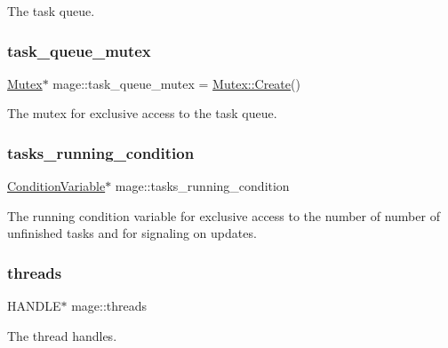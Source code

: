 The task queue. \hypertarget{namespacemage_a7de4544ddddcf8e0d54dbfdc0778f13f}{}\label{namespacemage_a7de4544ddddcf8e0d54dbfdc0778f13f} 
\subsubsection{\texorpdfstring{task\+\_\+queue\+\_\+mutex}{task\_queue\_mutex}}
{\footnotesize\ttfamily \hyperlink{classmage_1_1_mutex}{Mutex}$\ast$ mage\+::task\+\_\+queue\+\_\+mutex = \hyperlink{classmage_1_1_mutex_a48d784fa6bffd4088d9f89a2a9cca84e}{Mutex\+::\+Create}()\hspace{0.3cm}{\ttfamily [static]}}

The mutex for exclusive access to the task queue. \hypertarget{namespacemage_a8c04b4285ebbc0fb416b1905c01cf149}{}\label{namespacemage_a8c04b4285ebbc0fb416b1905c01cf149} 
\subsubsection{\texorpdfstring{tasks\+\_\+running\+\_\+condition}{tasks\_running\_condition}}
{\footnotesize\ttfamily \hyperlink{classmage_1_1_condition_variable}{Condition\+Variable}$\ast$ mage\+::tasks\+\_\+running\+\_\+condition\hspace{0.3cm}{\ttfamily [static]}}

The running condition variable for exclusive access to the number of number of unfinished tasks and for signaling on updates. \hypertarget{namespacemage_a15e9f7d36194ec1b768a82a2294cce6c}{}\label{namespacemage_a15e9f7d36194ec1b768a82a2294cce6c} 
\subsubsection{\texorpdfstring{threads}{threads}}
{\footnotesize\ttfamily H\+A\+N\+D\+LE$\ast$ mage\+::threads\hspace{0.3cm}{\ttfamily [static]}}

The thread handles. \hypertarget{namespacemage_a0f27594da3814c163fe995326acf6c5e}{}\label{namespacemage_a0f27594da3814c163fe995326acf6c5e} 
